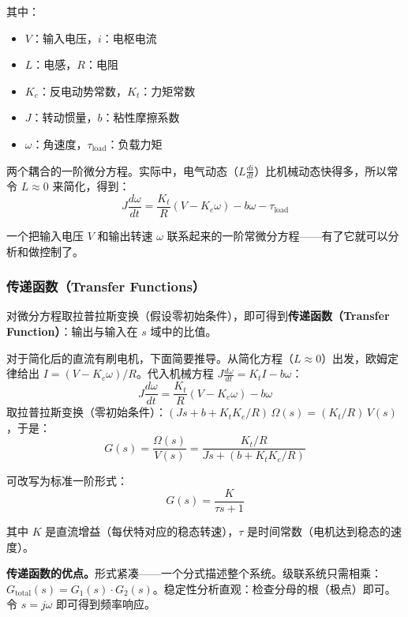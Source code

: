 其中：
\begin{itemize}[nosep]
    \item $V$：输入电压，$i$：电枢电流
    \item $L$：电感，$R$：电阻
    \item $K_e$：反电动势常数，$K_t$：力矩常数
    \item $J$：转动惯量，$b$：粘性摩擦系数
    \item $\omega$：角速度，$\tau_{\text{load}}$：负载力矩
\end{itemize}

两个耦合的一阶微分方程。实际中，电气动态（$L \frac{di}{dt}$）比机械动态快得多，所以常令 $L \approx 0$ 来简化，得到：
\begin{equation}
J \frac{d\omega}{dt} = \frac{K_t}{R}(V - K_e \omega) - b\omega - \tau_{\text{load}}
\end{equation}

一个把输入电压 $V$ 和输出转速 $\omega$ 联系起来的一阶常微分方程——有了它就可以分析和做控制了。

\subsubsection{传递函数（Transfer Functions）}

对微分方程取拉普拉斯变换（假设零初始条件），即可得到\textbf{传递函数（Transfer Function）}：输出与输入在 $s$ 域中的比值。

对于简化后的直流有刷电机，下面简要推导。从简化方程（$L \approx 0$）出发，欧姆定律给出 $I = (V - K_e \omega)/R$。代入机械方程 $J\frac{d\omega}{dt} = K_t I - b\omega$：
\[
J\frac{d\omega}{dt} = \frac{K_t}{R}(V - K_e \omega) - b\omega
\]
取拉普拉斯变换（零初始条件）：$(Js + b + K_t K_e / R)\,\Omega(s) = (K_t / R)\,V(s)$，于是：
\begin{equation}
G(s) = \frac{\Omega(s)}{V(s)} = \frac{K_t / R}{Js + (b + K_t K_e / R)}
\end{equation}

可改写为标准一阶形式：
\begin{equation}
G(s) = \frac{K}{\tau s + 1}
\end{equation}

其中 $K$ 是直流增益（每伏特对应的稳态转速），$\tau$ 是时间常数（电机达到稳态的速度）。

\textbf{传递函数的优点。}\;形式紧凑——一个分式描述整个系统。级联系统只需相乘：$G_{\text{total}}(s) = G_1(s) \cdot G_2(s)$。稳定性分析直观：检查分母的根（极点）即可。令 $s = j\omega$ 即可得到频率响应。

